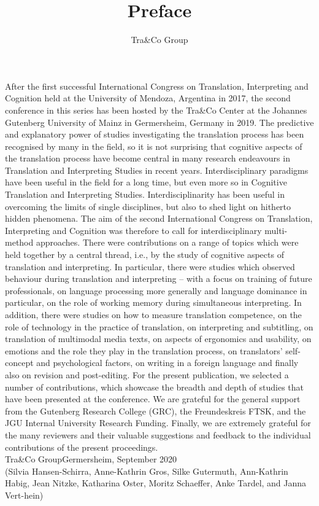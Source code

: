 \documentclass[output=paper]{langsci/langscibook}
\title{Preface}
\author{{Tra\&Co Group}\affiliation{Johannes Gutenberg University Mainz}}
\begin{document}
\maketitle

\noindent After the first successful International Congress on Translation, Interpreting and Cognition held at the University of Mendoza, Argentina in 2017, the second conference in this series has been hosted by the Tra\&Co Center at the Johannes Gutenberg University of Mainz in Germersheim, Germany in 2019. The predictive and explanatory power of studies investigating the translation process has been recognised by many in the field, so it is not surprising that cognitive aspects of the translation process have become central in many research endeavours in Translation and Interpreting Studies in recent years. Interdisciplinary paradigms have been useful in the field for a long time, but even more so in Cognitive Translation and Interpreting Studies. Interdisciplinarity has been useful in overcoming the limits of single disciplines, but also to shed light on hitherto hidden phenomena. The aim of the second International Congress on Translation, Interpreting and Cognition was therefore to call for interdisciplinary multi-method approaches. There were contributions on a range of topics which were held together by a central thread, i.e., by the study of cognitive aspects of translation and interpreting. In particular, there were studies which observed behaviour during translation and interpreting – with a focus on training of future professionals, on language processing more generally and language dominance in particular, on the role of working memory during simultaneous interpreting. In addition, there were studies on how to measure translation competence, on the role of technology in the practice of translation, on interpreting and subtitling, on translation of multimodal media texts, on aspects of ergonomics and usability, on emotions and the role they play in the translation process, on translators' self-concept and psychological factors, on writing in a foreign language and finally also on revision and post-editing. For the present publication, we selected a number of contributions, which showcase the breadth and depth of studies that have been presented at the conference. We are grateful for the general support from the Gutenberg Research College (GRC), the Freundeskreis FTSK, and the JGU Internal University Research Funding. Finally, we are extremely grateful for the many reviewers and their valuable suggestions and feedback to the individual contributions of the present proceedings.\bigskip\\

\noindent Tra\&Co Group\hfill Germersheim, September 2020\\
\noindent
(Silvia Hansen-Schirra, Anne-Kathrin Gros, Silke Gutermuth, Ann-Kathrin Habig, Jean Nitzke, Katharina Oster, Moritz Schaeffer, Anke Tardel, and Janna Vert-hein)
\end{document}
